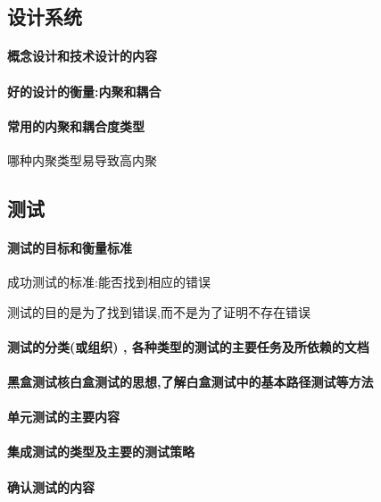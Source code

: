 \documentclass[UTF8,a4paper]{ctexart}
\begin{document}
\subsection{设计系统}
\paragraph{概念设计和技术设计的内容}

\paragraph{好的设计的衡量:内聚和耦合}

\paragraph{常用的内聚和耦合度类型}

哪种内聚类型易导致高内聚

\subsection{测试}
\paragraph{测试的目标和衡量标准}
成功测试的标准:能否找到相应的错误

测试的目的是为了找到错误,而不是为了证明不存在错误

\paragraph{测试的分类(或组织) , 各种类型的测试的主要任务及所依赖的文档}

\paragraph{黑盒测试核白盒测试的思想,了解白盒测试中的基本路径测试等方法}

\paragraph{单元测试的主要内容}

\paragraph{集成测试的类型及主要的测试策略}

\paragraph{确认测试的内容}
\end{document}
